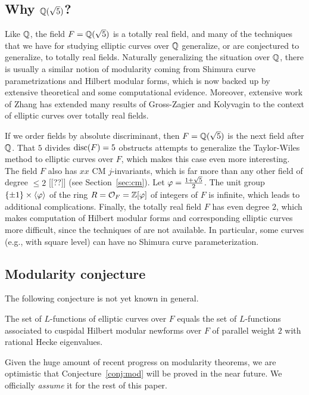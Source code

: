 \documentclass{article}
\begin{document}
\subsection{Why $\mathbb{Q}(\sqrt{5})$?}

Like $\mathbb{Q}$, the field $F=\mathbb{Q}(\sqrt{5})$ is a totally real field, and
many of the techniques that we have for studying elliptic curves over
$\mathbb{Q}$ generalize, or are conjectured to generalize, to totally real
fields.  Naturally generalizing the situation over $\mathbb{Q}$, there is
usually a similar notion of modularity coming from Shimura curve
parametrizations and Hilbert modular forms, which is now backed up by
extensive theoretical \cite{} and some computational \cite{} evidence.
Moreover, extensive work  \cite{} of Zhang has extended many results
of Gross-Zagier \cite{} and Kolyvagin \cite{} to the context of elliptic
curves over totally real fields.

If we order fields by absolute discriminant, then $F=\mathbb{Q}(\sqrt{5})$ is
the next field after $\mathbb{Q}$.  That $5$ divides $\operatorname{disc}(F)=5$ obstructs
attempts to generalize the Taylor-Wiles method to elliptic curves over
$F$, which makes this case even more interesting.  The field $F$ also
has $xx$ CM $j$-invariants, which is far more than any other field of
degree $\leq 2$ [[??]] (see Section~\ref{sec:cm}).  Let
$\varphi=\frac{1+\sqrt{5}}{2}$.  The unit group $\{\pm 1\} \times
\langle \varphi \rangle$ of the ring $R=\mathcal{O}_F=\mathbb{Z}[\varphi]$ of integers of
$F$ is infinite, which leads to additional complications.  Finally,
the totally real field $F$ has even degree $2$, which makes
computation of Hilbert modular forms and corresponding elliptic curves
more difficult, since the techniques of \cite{} are not available.  In
particular, some curves (e.g., with square level) can have no Shimura
curve parameterization.


\subsection{Modularity conjecture}\label{sec:mod}
The following conjecture is not yet known in general. 
\begin{conjecture}[Modularity]\label{conj:mod}
  The set of $L$-functions of elliptic curves over $F$ equals the set
  of $L$-functions associated to cuspidal Hilbert modular newforms
  over $F$ of parallel weight $2$ with rational Hecke eigenvalues.
\end{conjecture}
Given the huge amount of recent progress on modularity theorems, we
are optimistic that Conjecture~\ref{conj:mod} will be proved in the
near future.  We officially {\em assume} it for the rest of this
paper.
\end{document}
